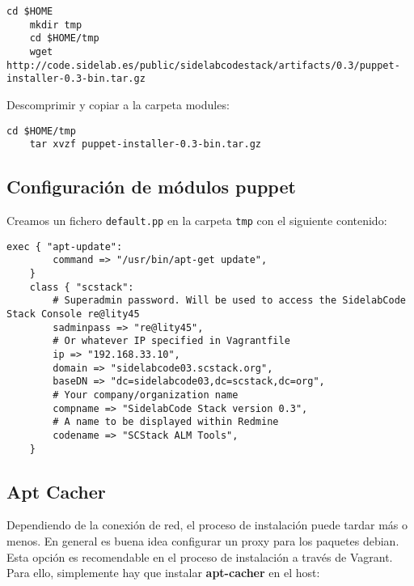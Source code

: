 \lstset{style=rubybasico}
\begin{lstlisting}[frame=trbl]
    cd $HOME
    mkdir tmp
    cd $HOME/tmp
    wget http://code.sidelab.es/public/sidelabcodestack/artifacts/0.3/puppet-installer-0.3-bin.tar.gz
\end{lstlisting}

\par Descomprimir y copiar a la carpeta modules:

\lstset{style=rubybasico}
\begin{lstlisting}[frame=trbl]
    cd $HOME/tmp
    tar xvzf puppet-installer-0.3-bin.tar.gz
\end{lstlisting}

\subsection{Configuración de módulos puppet}
\label{sub:conf-modulos-puppet}

\par Creamos un fichero \texttt{default.pp} en la carpeta \texttt{tmp} con el siguiente contenido:

\lstset{style=rubybasico}
\begin{lstlisting}[frame=trbl]
    exec { "apt-update":
        command => "/usr/bin/apt-get update",
    }
    class { "scstack":
        # Superadmin password. Will be used to access the SidelabCode Stack Console re@lity45
        sadminpass => "re@lity45",
        # Or whatever IP specified in Vagrantfile
        ip => "192.168.33.10", 
        domain => "sidelabcode03.scstack.org",
        baseDN => "dc=sidelabcode03,dc=scstack,dc=org",
        # Your company/organization name
        compname => "SidelabCode Stack version 0.3",
        # A name to be displayed within Redmine
        codename => "SCStack ALM Tools",
    }
\end{lstlisting}

\subsection{Apt Cacher}
\label{sub:apt-cacher}

\par Dependiendo de la conexión de red, el proceso de instalación puede tardar más o menos. En general es buena idea configurar un proxy para los paquetes debian. Esta opción es recomendable en el proceso de instalación a través de Vagrant. Para ello, simplemente hay que instalar \textbf{apt-cacher} en el host:

